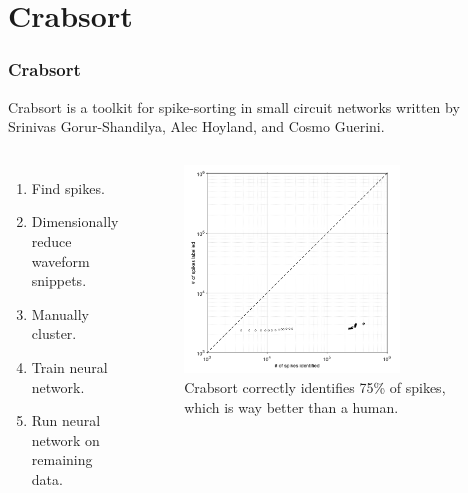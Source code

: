 \documentclass{beamer}
\begin{document}

\section{Crabsort}

\begin{frame}
  \frametitle{Crabsort}

  Crabsort is a toolkit for spike-sorting in small circuit networks written by
  Srinivas Gorur-Shandilya, Alec Hoyland, and Cosmo Guerini.

  \begin{columns}

    \begin{enumerate}
      \item Find spikes.
      \item Dimensionally reduce waveform snippets.
      \item Manually cluster.
      \item Train neural network.
      \item Run neural network on remaining data.
    \end{enumerate}


    \begin{figure}
      \includegraphics[width=0.75\textwidth]{gfx/crabsort-accuracy.png}
      \centering
      \caption{Crabsort correctly identifies 75\% of spikes, which is way better than a human.}
      \label{fig:crabsorting}
    \end{figure}

  \end{columns}

\end{frame}
\end{document}
